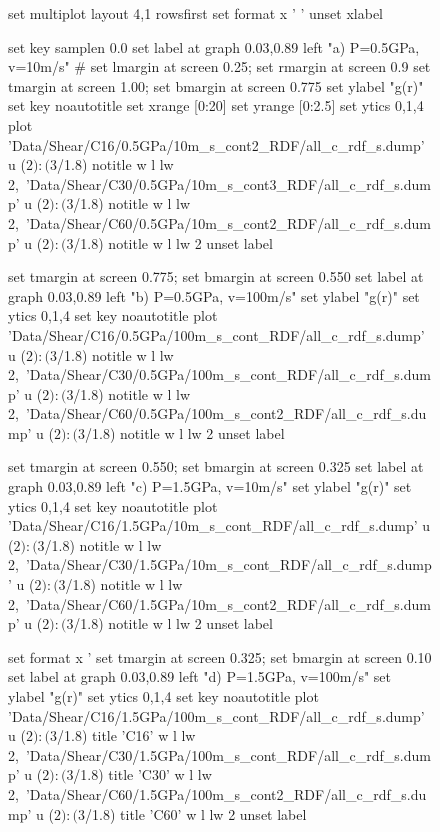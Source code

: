 \documentclass[aps,prb,reprint,superscriptaddress, a4paper]{revtex4-1}
\begin{document}
\begin{figure}
    	\begin{center}
		\begin{gnuplot}[terminal=pdf, terminaloptions={size \SERFigwidth cm, \SERFigheight cm color solid}]
			set multiplot layout 4,1 rowsfirst
			set format x ' '
			unset xlabel

			set key samplen  0.0
			set label at graph 0.03,0.89 left "a) P=0.5GPa, v=10m/s"
#			set lmargin at screen 0.25; set rmargin at screen 0.9
			set tmargin at screen 1.00; set bmargin at screen 0.775
			set ylabel "g(r)"
			set key noautotitle
			set xrange [0:20]
			set yrange [0:2.5]
			set ytics 0,1,4
			plot  	'Data/Shear/C16/0.5GPa/10m_s_cont2_RDF/all_c_rdf_s.dump' u  ($2):($3/1.8) notitle   w l lw 2,\
		        	'Data/Shear/C30/0.5GPa/10m_s_cont3_RDF/all_c_rdf_s.dump' u  ($2):($3/1.8) notitle   w l lw 2,\
		        	'Data/Shear/C60/0.5GPa/10m_s_cont2_RDF/all_c_rdf_s.dump' u  ($2):($3/1.8) notitle   w l lw 2
	    	unset label


			set tmargin at screen 0.775; set bmargin at screen 0.550
			set label at graph 0.03,0.89 left "b) P=0.5GPa, v=100m/s"
			set ylabel "g(r)"
			set ytics 0,1,4
			set key noautotitle
			plot  	'Data/Shear/C16/0.5GPa/100m_s_cont_RDF/all_c_rdf_s.dump' u  ($2):($3/1.8) notitle w l lw 2,\
		        	'Data/Shear/C30/0.5GPa/100m_s_cont_RDF/all_c_rdf_s.dump' u  ($2):($3/1.8) notitle   w l lw 2,\
		        	'Data/Shear/C60/0.5GPa/100m_s_cont2_RDF/all_c_rdf_s.dump' u  ($2):($3/1.8) notitle  w l lw 2
	    	unset label



			set tmargin at screen 0.550; set bmargin at screen 0.325
			set label at graph 0.03,0.89 left "c) P=1.5GPa, v=10m/s"
			set ylabel "g(r)"
			set ytics 0,1,4
			set key noautotitle
			plot  	'Data/Shear/C16/1.5GPa/10m_s_cont_RDF/all_c_rdf_s.dump' u  ($2):($3/1.8) notitle   w l lw 2,\
		        	'Data/Shear/C30/1.5GPa/10m_s_cont_RDF/all_c_rdf_s.dump' u  ($2):($3/1.8) notitle   w l lw 2,\
		        	'Data/Shear/C60/1.5GPa/10m_s_cont2_RDF/all_c_rdf_s.dump' u  ($2):($3/1.8) notitle   w l lw 2
	    	unset label

			set format x '%
			set tmargin at screen 0.325; set bmargin at screen 0.10
			set label at graph 0.03,0.89 left "d) P=1.5GPa, v=100m/s"
			set ylabel "g(r)"
			set ytics 0,1,4
			set key noautotitle
			plot  	'Data/Shear/C16/1.5GPa/100m_s_cont_RDF/all_c_rdf_s.dump' u  ($2):($3/1.8) title  'C16' w l lw 2,\
		        	'Data/Shear/C30/1.5GPa/100m_s_cont_RDF/all_c_rdf_s.dump' u  ($2):($3/1.8) title  'C30' w l lw 2,\
		        	'Data/Shear/C60/1.5GPa/100m_s_cont2_RDF/all_c_rdf_s.dump' u  ($2):($3/1.8) title  'C60' w l lw 2
	    	unset label


\end{gnuplot}
\end{center}
\end{figure}
\end{document}
